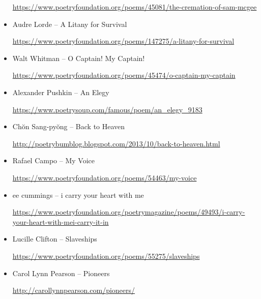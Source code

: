 \documentclass[12pt, openany, letterpaper]{memoir}
\begin{document}
\begin{itemize}
	\hyperref[https://www.poetryfoundation.org/poems/45081/the-cremation-of-sam-mcgee]{https://www.poetryfoundation.org/poems/45081/the-cremation-of-sam-mcgee}
	
	\item Audre Lorde -- A Litany for Survival
	
	\hyperref[https://www.poetryfoundation.org/poems/147275/a-litany-for-survival]{https://www.poetryfoundation.org/poems/147275/a-litany-for-survival}
	
	\item Walt Whitman -- O Captain! My Captain!
	
	\hyperref[https://www.poetryfoundation.org/poems/45474/o-captain-my-captain]{https://www.poetryfoundation.org/poems/45474/o-captain-my-captain}
	
	\item Alexander Pushkin -- An Elegy
	
	\hyperref[https://www.poetrysoup.com/famous/poem/an_elegy_9183]{https://www.poetrysoup.com/famous/poem/an\_elegy\_9183}
	
	\item  Chŏn Sang-pyŏng -- Back to Heaven
	
	\hyperref[http://poetrybumblog.blogspot.com/2013/10/back-to-heaven.html]{http://poetrybumblog.blogspot.com/2013/10/back-to-heaven.html}
	
	\item Rafael Campo -- My Voice
	
	\hyperref[https://www.poetryfoundation.org/poems/54463/my-voice]{https://www.poetryfoundation.org/poems/54463/my-voice}
	
	\item ee cummings -- i carry your heart with me
	
	\hyperref[https://www.poetryfoundation.org/poetrymagazine/poems/49493/i-carry-your-heart-with-mei-carry-it-in]{https://www.poetryfoundation.org/poetrymagazine/poems/49493/i-carry-your-heart-with-mei-carry-it-in}
	
	\item Lucille Clifton -- Slaveships
	
	\hyperref[https://www.poetryfoundation.org/poems/55275/slaveships]{https://www.poetryfoundation.org/poems/55275/slaveships}
	
	\item Carol Lynn Pearson -- Pioneers
	
	\hyperref[http://carollynnpearson.com/pioneers/]{http://carollynnpearson.com/pioneers/}
	

\end{itemize}
\end{document}
